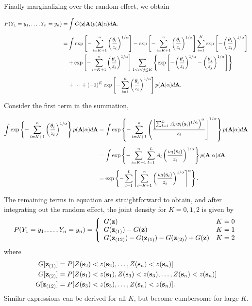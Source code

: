 \documentclass[12pt]{article}
\begin{document}
Finally marginalizing over the random effect, we obtain

\begin{align} \label{rbeq:joint}
    P(Y_1=y_1,\ldots,Y_n=y_n) =&\int G(\mathbf{z} | \mathbf{A}) p( \mathbf{A} | \alpha) d\mathbf{A}. \nonumber\\[0.5em]
			=& \int \exp \left[ -\sum_{ i = K+1}^{ n }\left( \frac{ \theta_i }{ z_i } \right)^{1/\alpha} \right] - \exp \left[ -\sum_{ i = K+1}^{ n }\left( \frac{ \theta_i }{ z_i } \right)^{1/\alpha} \right] \sum_{ i = 1}^{K} \exp\left[ -\left( \frac{ \theta_i }{ z_i } \right)^{ 1/\alpha} \right] \nonumber\\
		&  + \exp \left[ -\sum_{ i = K+1}^{ n }\left( \frac{ \theta_i }{ z_i } \right)^{1/\alpha} \right] \sum_{ 1 < i < j \le K } \left\{ \exp \left[ - \left( \frac{ \theta_i }{ z_i } \right)^{ 1/\alpha} - \left( \frac{ \theta_j }{ z_j } \right)^{ 1/\alpha } \right] \right \} \nonumber \\[0.5em]
		& + \cdots + (-1)^K \exp\left[ - \sum_{ i = 1 }^{ n }\left( \frac{ \theta_i }{ z_i } \right)^{ 1/\alpha} \right] p( \mathbf{A} | \alpha) d\mathbf{A}.
\end{align}

Consider the first term in the summation,

\begin{align}
	\int \exp \left\{ -\sum_{ i = K+1}^{ n }\left( \frac{ \theta_i }{ z_i } \right)^{1/\alpha} \right\} p( \mathbf{A} | \alpha) d\mathbf{A} &= \int \exp \left\{ - \sum_{ i = K + 1 }^n \left( \frac{ \left[ \sum_{ l = 1 }^L  A_l w_{l}(\mathbf{s}_i)^{1/\alpha} \right)^\alpha }{ z_i} \right]^{ 1/\alpha } \right \} p( \mathbf{A} | \alpha) d\mathbf{A} \nonumber \\[0.5em]
	 &= \int \exp \left\{ -\sum_{ i = K + 1}^n \sum_{ l = 1}^L A_l \left( \frac{ w_l (\mathbf{s}_i) }{ z_i } \right)^{1/\alpha} \right \} p( \mathbf{A} | \alpha) d\mathbf{A} \nonumber \\[0.5em]
	 &=\exp\left\{-\sum_{ l = 1}^L \left[ \sum_{ i = K + 1 }^n \left( \frac{ w_l(\mathbf{s}_i)}{ z_i} \right)^{1/\alpha} \right]^\alpha \right\}.
\end{align}

The remaining terms in equation  are straightforward to obtain, and after integrating out the random effect, the joint density for $K = 0, 1, 2$ is given by
\begin{align}\label{rbeq:pmf}
  P(Y_1=y_1,\ldots,Y_n=y_n) =  \left\{
    \begin{array}{ll}
      G(\mathbf{z}) & K=0 \\
      G(\mathbf{z}_{(1)})-G(\mathbf{z}) & K=1 \\
      G(\mathbf{z}_{(12)})-G(\mathbf{z}_{(1)})-G(\mathbf{z}_{(2)})+G(\mathbf{z}) & K=2
    \end{array}
  \right.
\end{align}
where
\begin{align*}
  G[\mathbf{z}_{(1)}] &= P[Z(\mathbf{s}_2)<z(\mathbf{s}_2),\ldots,Z(\mathbf{s}_n)<z(\mathbf{s}_n)] \\
  G[\mathbf{z}_{(2)}] &= P[Z(\mathbf{s}_1)<z(\mathbf{s}_1),Z(\mathbf{s}_3)<z(\mathbf{s}_3),\ldots,Z(\mathbf{s}_n)<z(\mathbf{s}_n)]\\
  G[\mathbf{z}_{(12)}] &= P[Z(\mathbf{s}_3)<z(\mathbf{s}_3),\ldots,Z(\mathbf{s}_n)<z(\mathbf{s}_n)].
\end{align*}
Similar expressions can be derived for all $K$, but become cumbersome for large $K$.
\end{document}
